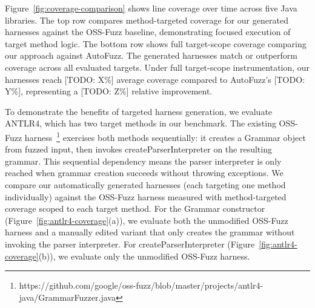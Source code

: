 Figure~\ref{fig:coverage-comparison} shows line coverage over time across five Java libraries. The top row compares method-targeted coverage for our generated harnesses against the OSS-Fuzz baseline, demonstrating focused execution of target method logic. The bottom row shows full target-scope coverage comparing our approach against AutoFuzz.
The generated harnesses match or outperform coverage across all evaluated targets. Under full target-scope instrumentation, our harnesses reach [TODO: X\%] average coverage compared to AutoFuzz's [TODO: Y\%], representing a [TODO: Z\%] relative improvement.
%
%
%
\par

To demonstrate the benefits of targeted harness generation, we evaluate ANTLR4, which has two target methods in our benchmark. The existing OSS-Fuzz harness~\footnote{https://github.com/google/oss-fuzz/blob/master/projects/antlr4-java/GrammarFuzzer.java} exercises both methods sequentially: it creates a Grammar object from fuzzed input, then invokes createParserInterpreter on the resulting grammar. This sequential dependency means the parser interpreter is only reached when grammar creation succeeds without throwing exceptions.
We compare our automatically generated harnesses (each targeting one method individually) against the OSS-Fuzz harness measured with method-targeted coverage scoped to each target method. For the Grammar constructor (Figure~\ref{fig:antlr4-coverage}(a)), we evaluate both the unmodified OSS-Fuzz harness and a manually edited variant that only creates the grammar without invoking the parser interpreter. For createParserInterpreter (Figure~\ref{fig:antlr4-coverage}(b)), we evaluate only the unmodified OSS-Fuzz harness.
